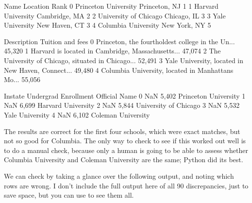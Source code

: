 \documentclass[letterpaper,10pt,english]{sphinxmanual}
\begin{document}
\begin{sphinxVerbatim}[commandchars=\\\{\}]
                    Name       Location  Rank  \PYGZbs{}
0   Princeton University  Princeton, NJ     1   
1     Harvard University  Cambridge, MA     2   
2  University of Chicago    Chicago, IL     3   
3        Yale University  New Haven, CT     3   
4    Columbia University   New York, NY     5   

                                         Description Tuition and fees  \PYGZbs{}
0  Princeton, the fourth\PYGZhy{}oldest college in the Un...         \PYGZdl{}45,320    
1  Harvard is located in Cambridge, Massachusetts...         \PYGZdl{}47,074    
2  The University of Chicago, situated in Chicago...         \PYGZdl{}52,491    
3  Yale University, located in New Haven, Connect...         \PYGZdl{}49,480    
4  Columbia University, located in Manhattan\PYGZsq{}s Mo...         \PYGZdl{}55,056    

  In\PYGZhy{}state Undergrad Enrollment          Official Name  
0      NaN                5,402   Princeton University  
1      NaN                6,699     Harvard University  
2      NaN                5,844  University of Chicago  
3      NaN                5,532        Yale University  
4      NaN                6,102     Coleman University  
\end{sphinxVerbatim}

The results are correct for the first four schools, which were exact matches, but not so good for Columbia.  The only way to check to see if this worked out well is to do a manual check, because only a human is going to be able to assess whether Columbia University and Coleman University are the same; Python did its best.

We can check by taking a glance over the following output, and noting which rows are wrong.  I don’t include the full output here of all 90 discrepancies, just to save space, but you can use  to see them all.

\begin{sphinxVerbatim}[commandchars=\\\{\}]
  \PYG{p}{[} \PYG{p}{[}\PYG{p}{]}  \PYG{p}{[}\PYG{p}{]} \PYG{p}{]}
\PYG{p}{[}\PYG{p}{[}\PYG{p}{]}\PYG{p}{]}
\end{sphinxVerbatim}
\end{document}
